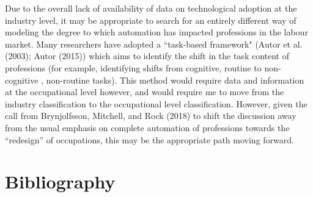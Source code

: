 \documentclass[12pt]{article}
\begin{document}
\begin{flushleft}
\break
\linebreak
Due to the overall lack of availability of data on technological adoption at the industry level, it may be appropriate to search for an entirely different way of modeling the degree to which automation has impacted professions in the labour market. Many researchers have adopted a ``task-based framework" (Autor et al. (2003); Autor (2015))  which aims to identify the shift in the task content of professions (for example, identifying shifts from cognitive, routine to non-cognitive , non-routine tasks). This method would require data and information at the occupational level however, and would require me to move from the industry classification to the occupational level classification. However, given the call from Brynjolfsson, Mitchell, and Rock (2018) to shift the discussion away from the usual emphasis on complete automation of professions  towards the “redesign” of occupations, this may be the appropriate path moving forward.
\end{flushleft}

\newpage

\section{Bibliography}
\end{document}

